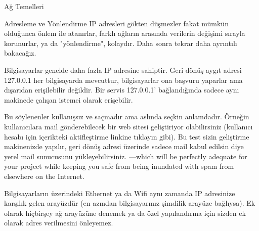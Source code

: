 \begin{section}{Ağ Temelleri}
\begin{subsection}{Adresleme ve Yönlendirme}
IP adresleri gökten düşmezler fakat mümkün olduğunca önlem ile atanırlar, farklı ağların arasında verilerin değişimi sırayla korunurlar, ya da "yönlendirme", kolaydır. Daha sonra tekrar daha ayrıntılı bakacağız. 

Bilgisayarlar genelde daha fazla IP adresine sahiptir. Geri dönüş aygıt adresi 127.0.0.1 her bilgisayarda mevcuttur, bilgisayarlar ona başvuru yaparlar ama dışarıdan erişilebilir değildir. Bir servis 127.0.0.1' bağlandığında sadece aynı makinede çalışan istemci olarak erişebilir.

Bu söylenenler kullanışsız ve saçmadır ama aslında seçkin anlamdadır. Örneğin kullanıcılara mail gönderebilecek bir web sitesi geliştiriyor olabilirsiniz (kullanıcı hesabı için içerikteki aktifleştirme linkine tıklayın gibi). Bu test sizin geliştirme makinenizde yapılır, geri dönüş adresi üzerinde sadece mail kabul edilsin diye yerel mail sunucusunu yükleyebilirsiniz. —which will be perfectly adequate for your project while keeping you safe from being inundated with spam from elsewhere on the Internet.

Bilgisayarların üzerindeki Ethernet ya da Wifi aynı zamanda IP adresinize karşılık gelen arayüzdür (en azından bilgisayarınız şimdilik arayüze bağlıysa). Ek olarak hiçbirşey  ağ arayüzüne denemek ya da özel yapılandırma için sizden ek olarak adres verilmesini önleyemez.


\end{subsection}
\end{section}
